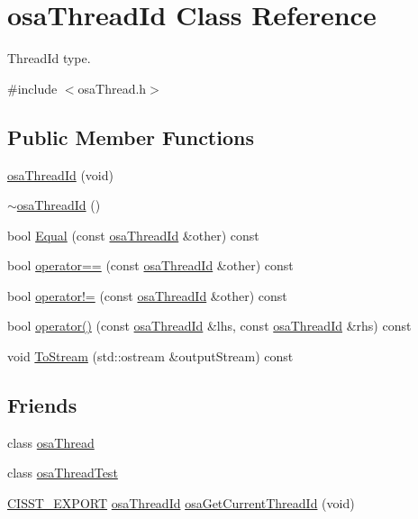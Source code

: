 \hypertarget{classosa_thread_id}{}\section{osa\+Thread\+Id Class Reference}
\label{classosa_thread_id}


Thread\+Id type.  




{\ttfamily \#include $<$osa\+Thread.\+h$>$}

\subsection*{Public Member Functions}
\begin{DoxyCompactItemize}
\item 
\hyperlink{classosa_thread_id_aeb44a37d0492c197b9cb22b7b039d242}{osa\+Thread\+Id} (void)
\item 
\hyperlink{classosa_thread_id_aea58cbec56c88f6546800ef9e59b70e8}{$\sim$osa\+Thread\+Id} ()
\item 
bool \hyperlink{classosa_thread_id_a2fec44f6d2c93dd3df13d70a7bd4a8d4}{Equal} (const \hyperlink{classosa_thread_id}{osa\+Thread\+Id} \&other) const 
\item 
bool \hyperlink{classosa_thread_id_a93c9520bdd2ce99a76c22fe0e615b6d2}{operator==} (const \hyperlink{classosa_thread_id}{osa\+Thread\+Id} \&other) const 
\item 
bool \hyperlink{classosa_thread_id_a398145889ad5594d5a08a9f74ba1ec2b}{operator!=} (const \hyperlink{classosa_thread_id}{osa\+Thread\+Id} \&other) const 
\item 
bool \hyperlink{classosa_thread_id_a37b34e88b38585f7f34ef043bf39e6dd}{operator()} (const \hyperlink{classosa_thread_id}{osa\+Thread\+Id} \&lhs, const \hyperlink{classosa_thread_id}{osa\+Thread\+Id} \&rhs) const 
\item 
void \hyperlink{classosa_thread_id_afb21803bee3dbe0d721a4c6b6737e2df}{To\+Stream} (std\+::ostream \&output\+Stream) const 
\end{DoxyCompactItemize}
\subsection*{Friends}
\begin{DoxyCompactItemize}
\item 
class \hyperlink{classosa_thread_id_a35e7a1b0202c45103302d0073f377e57}{osa\+Thread}
\item 
class \hyperlink{classosa_thread_id_a542e7acdd9a832dddf65bf204d2df936}{osa\+Thread\+Test}
\item 
\hyperlink{cmn_export_macros_8h_a99393e0c3ac434b2605235bbe20684f8}{C\+I\+S\+S\+T\+\_\+\+E\+X\+P\+O\+R\+T} \hyperlink{classosa_thread_id}{osa\+Thread\+Id} \hyperlink{classosa_thread_id_ab77759b2805dbd140c65481a68760ab5}{osa\+Get\+Current\+Thread\+Id} (void)
\end{DoxyCompactItemize}


